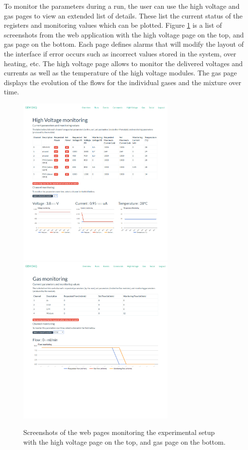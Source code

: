       To monitor the parameters during a run, the user can use the high voltage and gas pages to view an extended list of details. These list the current status of the registers and monitoring values which can be plotted. Figure \ref{fig:III-1-app-monitor} is a list of screenshots from the web application with the high voltage page on the top, and gas page on the bottom. Each page defines alarms that will modify the layout of the interface if error occurs such as incorrect values stored in the system, over heating, etc. The high voltage page allows to monitor the delivered voltages and currents as well as the temperature of the high voltage modules. The gas page displays the evolution of the flows for the individual gases and the mixture over time. \\

      \begin{figure}[p!]
        \centering
        \includegraphics[width=0.7\textwidth]{img/III-1-arch/app-hv.png}
        \includegraphics[width=0.7\textwidth]{img/III-1-arch/app-gas.png}
        \caption{Screenshots of the web pages monitoring the experimental setup with the high voltage page on the top, and gas page on the bottom.}
        \label{fig:III-1-app-monitor}
      \end{figure}

